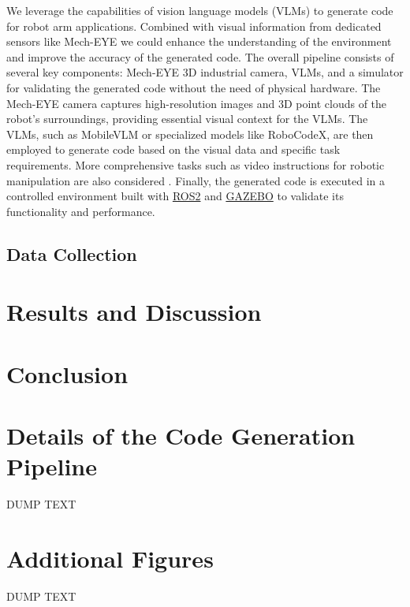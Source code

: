 \documentclass[conference]{IEEEtran}
\begin{document}
We leverage the capabilities of vision language models (VLMs) to generate code for robot arm applications. Combined with visual information from dedicated sensors like Mech-EYE we could enhance the understanding of the environment and improve the accuracy of the generated code. 
The overall pipeline consists of several key components: Mech-EYE 3D industrial camera, VLMs, and a simulator for validating the generated code without the need of physical hardware. The Mech-EYE camera captures high-resolution images and 3D point clouds of the robot's surroundings, providing essential visual context for the VLMs. The VLMs, such as MobileVLM or specialized models like RoboCodeX\cite{mu2024robocodex}, are then employed to generate code based on the visual data and specific task requirements. More comprehensive tasks such as video instructions for robotic manipulation are also considered \cite{xie2025robotic}.
Finally, the generated code is executed in a controlled environment built with \href{https://docs.ros.org/}{ROS2} and \href{http://gazebosim.org/}{GAZEBO} to validate its functionality and performance.

\subsection{Data Collection}



\section{Results and Discussion}
\section{Conclusion}

\appendices
\section{Details of the Code Generation Pipeline}
DUMP TEXT

\section{Additional Figures}
DUMP TEXT



\vspace{12pt}
\end{document}
